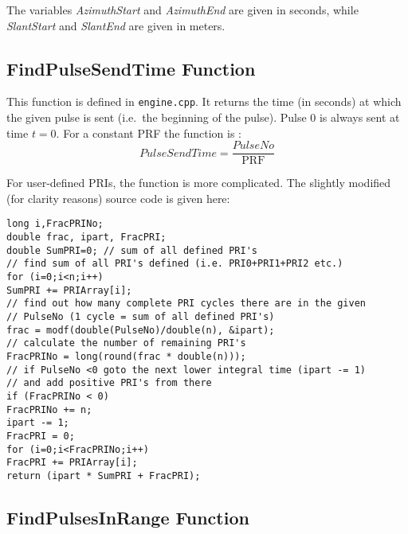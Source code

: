 
The variables \textit{AzimuthStart} and \textit{AzimuthEnd} are given in
seconds, while \textit{SlantStart} and \textit{SlantEnd} are given in meters.

\subsection{FindPulseSendTime Function}

This function is defined in \texttt{engine.cpp}. It returns the time (in
seconds) at which the given pulse is sent (i.e.~the beginning of the pulse).
Pulse $0$ is always sent at time $t=0$. For a constant PRF the function is : 
\begin{equation}
PulseSendTime=\frac{PulseNo}{\text{PRF}}
\end{equation}

For user-defined PRIs, the function is more complicated. The slightly
modified (for clarity reasons) source code is given here:

\tiny
%
\begin{verbatim}
long i,FracPRINo;
double frac, ipart, FracPRI;
double SumPRI=0; // sum of all defined PRI's
// find sum of all PRI's defined (i.e. PRI0+PRI1+PRI2 etc.)
for (i=0;i<n;i++)
SumPRI += PRIArray[i];
// find out how many complete PRI cycles there are in the given
// PulseNo (1 cycle = sum of all defined PRI's)
frac = modf(double(PulseNo)/double(n), &ipart);
// calculate the number of remaining PRI's
FracPRINo = long(round(frac * double(n)));
// if PulseNo <0 goto the next lower integral time (ipart -= 1)
// and add positive PRI's from there
if (FracPRINo < 0)
FracPRINo += n;
ipart -= 1;
FracPRI = 0;
for (i=0;i<FracPRINo;i++)
FracPRI += PRIArray[i];
return (ipart * SumPRI + FracPRI);
\end{verbatim}

\normalsize%

\subsection{FindPulsesInRange Function}

